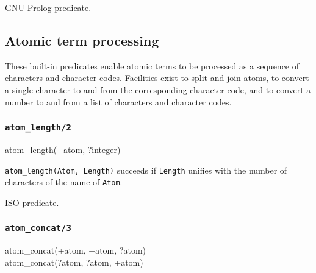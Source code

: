 \Portability

GNU Prolog predicate.

\subsection{Atomic term processing}
These built-in predicates enable atomic terms to be processed as a sequence
of characters and character codes. Facilities exist to split and join atoms,
to convert a single character to and from the corresponding character code,
and to convert a number to and from a list of characters and character
codes.

\subsubsection{\texttt{atom\_length/2}}

\begin{TemplatesOneCol}
atom\_length(+atom, ?integer)

\end{TemplatesOneCol}

\Description

\texttt{atom\_length(Atom, Length)} succeeds if \texttt{Length} unifies with
the number of characters of the name of \texttt{Atom}.

\begin{PlErrors}





\end{PlErrors}

\Portability

ISO predicate.

\subsubsection{\texttt{atom\_concat/3}}

\begin{TemplatesOneCol}
atom\_concat(+atom, +atom, ?atom)\\
atom\_concat(?atom, ?atom, +atom)

\end{TemplatesOneCol}

